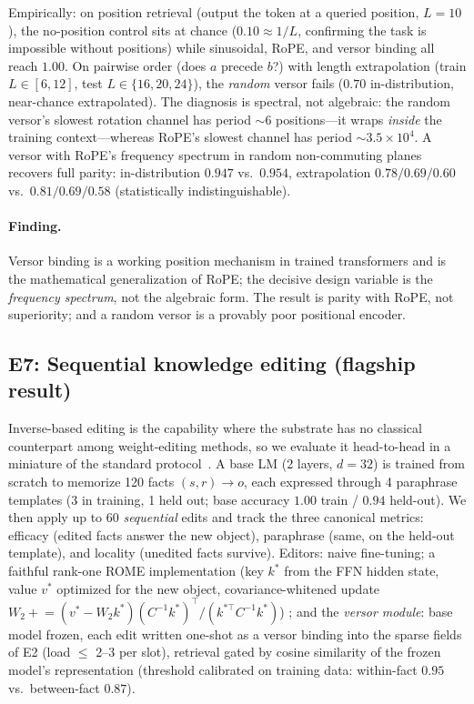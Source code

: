 \documentclass[10pt,twocolumn]{article}
\begin{document}
Empirically: on position retrieval (output the token at a queried position,
$L{=}10$), the no-position control sits at chance ($0.10\approx 1/L$,
confirming the task is impossible without positions) while sinusoidal, RoPE,
and versor binding all reach $1.00$. On pairwise order (does $a$ precede $b$?)
with length extrapolation (train $L\in[6,12]$, test $L\in\{16,20,24\}$), the
\emph{random} versor fails ($0.70$ in-distribution, near-chance extrapolated).
The diagnosis is spectral, not algebraic: the random versor's slowest rotation
channel has period ${\sim}6$ positions---it wraps \emph{inside} the training
context---whereas RoPE's slowest channel has period ${\sim}3.5{\times}10^{4}$.
A versor with RoPE's frequency spectrum in random non-commuting planes recovers
full parity: in-distribution $0.947$ vs.\ $0.954$, extrapolation
$0.78/0.69/0.60$ vs.\ $0.81/0.69/0.58$ (statistically indistinguishable).

\paragraph{Finding.} Versor binding is a working position mechanism in trained
transformers and is the mathematical generalization of RoPE; the decisive design
variable is the \emph{frequency spectrum}, not the algebraic form. The result is
parity with RoPE, not superiority; and a random versor is a provably poor
positional encoder.

\subsection{E7: Sequential knowledge editing (flagship result)}
\label{sec:e7}
Inverse-based editing is the capability where the substrate has no classical
counterpart among weight-editing methods, so we evaluate it head-to-head in a
miniature of the standard protocol~\cite{meng2022rome}. A base LM (2 layers,
$d{=}32$) is trained from scratch to memorize 120 facts
$(s,r)\!\to\!o$, each expressed through 4 paraphrase templates (3 in training,
1 held out; base accuracy $1.00$ train / $0.94$ held-out). We then apply up to
60 \emph{sequential} edits and track the three canonical metrics: efficacy
(edited facts answer the new object), paraphrase (same, on the held-out
template), and locality (unedited facts survive). Editors: naive fine-tuning;
a faithful rank-one ROME implementation (key $k^*$ from the FFN hidden state,
value $v^*$ optimized for the new object, covariance-whitened update
$W_2 \mathrel{+}= (v^*-W_2k^*)(C^{-1}k^*)^\top/(k^{*\top}C^{-1}k^*)$)
\cite{meng2022rome}; and the \emph{versor module}: base model frozen, each edit
written one-shot as a versor binding into the sparse fields of E2
(load $\le$ 2--3 per slot), retrieval gated by cosine similarity of the frozen
model's representation (threshold calibrated on training data: within-fact
$0.95$ vs.\ between-fact $0.87$).
\end{document}
